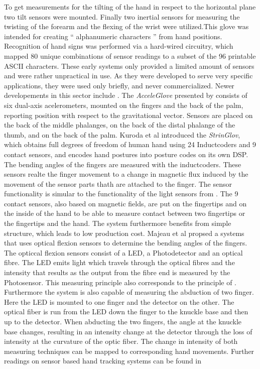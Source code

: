 To get measurements  for the tilting of the hand in respect to the horizontal plane two tilt sensors were mounted. Finally two inertial sensors for measuring the twisting of the forearm and the flexing of the wrist were utilized.This glove was intended for creating “ alphanumeric characters ” from hand positions. Recognition of hand signs was performed via a hard-wired circuitry, which mapped 80 unique combinations of sensor readings to a subset of the 96 printable ASCII characters.
These early systems only provided a limited amount of sensors and were rather unpractical in use. As they were developed to serve very specific applications,  they were used only briefly, and never commercialized.
Newer developements in this sector include \cite{Kuroda.2004,HernandezRebollar.2002,Majeau.2012}. The \textit{AcceleGlove} presented by \cite{HernandezRebollar.2002} consists of six dual-axis acelerometers, mounted on the fingers and the back of the palm, reporting position with respect to the gravitational vector. Sensors are placed on the back of the middle phalanges, on the back of the distal phalange of the thumb, and on the back of the palm.
Kuroda et al \cite{Kuroda.2004} introduced the \textit{StrinGlov}, which obtains full degrees of freedom of human hand using 24 Inductcoders and 9 contact sensors, and encodes hand postures into posture codes on its own DSP. The bending angles of the fingers are measured with the inductcoders. These sensors realte the finger movement to a change in magnetic flux induced by the movement of the sensor parts thath are attached to the finger. The sensor functionality is simular to the functionality of the light sensors from \cite{ThomasA.DeFanti.1977}. The 9 contact sensors, also based on magnetic fields,  are put on the fingertips and on the inside of the hand to be able to measure contact between two fingertips or the fingertips and the hand. The system furthermore benefits from simple structure, which leads to low production cost. 
Majeau et al \cite{Majeau.2012} propsed a systems that uses optical flexion sensors to determine the bending angles of the fingers. The opticcal flexion sensors consist of a LED, a Photodetector and an optical fibre. The LED emits light which travels through the optical fibres and the intensity that results as the output from the fibre end is measured by the Photosensor. This measuring principle also corresponds to the principle of \cite{ThomasA.DeFanti.1977}. Furthermore the system is also capable of measuring the abduction of two finger. Here the LED is mounted to one finger and the detector on the other. The optical fiber is run from the LED down the finger to the knuckle base and then up to the detector. When abducting the two fingers, the angle at the knuckle base changes, resulting in an intensity change at the detector through the loss of intensity at the curvature of the optic fiber.
The change in intensity of both measuring techniques can be mapped to corresponding hand movements.
Further readings on sensor based hand tracking systems can be found in \cite{Dipietro.2008,Sturman.1994}
